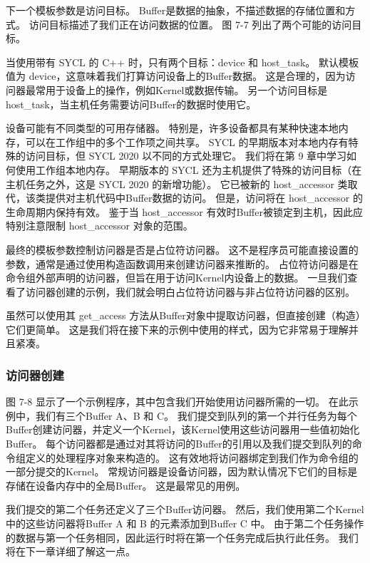 下一个模板参数是访问目标。 Buffer是数据的抽象，不描述数据的存储位置和方式。 
访问目标描述了我们正在访问数据的位置。 图 7-7 列出了两个可能的访问目标。

当使用带有 SYCL 的 C++ 时，只有两个目标：device 和 host\_task。 
默认模板值为 device，这意味着我们打算访问设备上的Buffer数据。 
这是合理的，因为访问器最常用于设备上的操作，例如Kernel或数据传输。 
另一个访问目标是 host\_task，当主机任务需要访问Buffer的数据时使用它。

设备可能有不同类型的可用存储器。 特别是，许多设备都具有某种快速本地内存，可以在工作组中的多个工作项之间共享。 
SYCL 的早期版本对本地内存有特殊的访问目标，但 SYCL 2020 以不同的方式处理它。 
我们将在第 9 章中学习如何使用工作组本地内存。
早期版本的 SYCL 还为主机提供了特殊的访问目标（在主机任务之外，这是 SYCL 2020 的新增功能）。 
它已被新的 host\_accessor 类取代，该类提供对主机代码中Buffer数据的访问。 
但是，访问将在 host\_accessor 的生命周期内保持有效。 
鉴于当 host\_accessor 有效时Buffer被锁定到主机，因此应特别注意限制 host\_accessor 对象的范围。

最终的模板参数控制访问器是否是占位符访问器。 
这不是程序员可能直接设置的参数，通常是通过使用构造函数调用来创建访问器来推断的。 
占位符访问器是在命令组外部声明的访问器，但旨在用于访问Kernel内设备上的数据。 
一旦我们查看了访问器创建的示例，我们就会明白占位符访问器与非占位符访问器的区别。

虽然可以使用其 get\_access 方法从Buffer对象中提取访问器，但直接创建（构造）它们更简单。 
这是我们将在接下来的示例中使用的样式，因为它非常易于理解并且紧凑。

\subsubsection{访问器创建}
图 7-8 显示了一个示例程序，其中包含我们开始使用访问器所需的一切。 
在此示例中，我们有三个Buffer A、B 和 C。
我们提交到队列的第一个并行任务为每个Buffer创建访问器，并定义一个Kernel，该Kernel使用这些访问器用一些值初始化Buffer。 
每个访问器都是通过对其将访问的Buffer的引用以及我们提交到队列的命令组定义的处理程序对象来构造的。 
这有效地将访问器绑定到我们作为命令组的一部分提交的Kernel。 
常规访问器是设备访问器，因为默认情况下它们的目标是存储在设备内存中的全局Buffer。 这是最常见的用例。

我们提交的第二个任务还定义了三个Buffer访问器。 
然后，我们使用第二个Kernel中的这些访问器将Buffer A 和 B 的元素添加到Buffer C 中。
由于第二个任务操作的数据与第一个任务相同，因此运行时将在第一个任务完成后执行此任务。 
我们将在下一章详细了解这一点。

